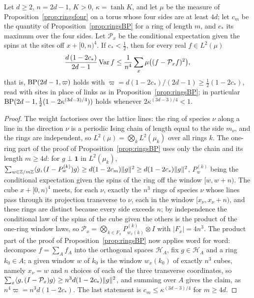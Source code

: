 \begin{proposition}
\label{prop:symBP}
Let $d\ge2$, $n=2d-1$, $K>0$, $\kappa=\tanh K$, and let $\mu$ be the measure of
Proposition~\ref{prop:ringsfour} on a torus whose four sides are at least
$4d$; let $c_m$ be the quantity of Proposition~\ref{prop:ringsBP} for a ring
of length $m$, and $c_*$ its maximum over the four sides. Let $\mathcal P_x$ be
the conditional expectation given the spins at the sites off $x+[0,n)^4$. If
$c_*<\frac12$, then for every real $f\in L^2(\mu)$
\[
\frac{d\,(1-2c_*)}{2d-1}\operatorname{Var} f\le\frac1{n^4}\sum_x\mu\bigl((f-\mathcal P_xf)^2
\bigr),
\]
that is, $\mathrm{BP}(2d-1,\varpi)$ holds with $\varpi=d(1-2c_*)/(2d-1)\ge\frac12(1-
2c_*)$, read with sites in place of links as in Proposition~\ref{prop:ringsBP};
in particular $\mathrm{BP}(2d-1,\frac12(1-2\kappa^{(3d-3)/4}))$ holds whenever
$2\kappa^{(3d-3)/4}<1$.
\end{proposition}

\begin{proof}
The weight factorises over the lattice lines: the ring of species $\nu$ along
a line in the direction $\nu$ is a periodic Ising chain of length equal to
the side $m_\nu$, and the rings are independent, so $L^2(\mu)=\bigotimes_k
L^2(\mu_k)$ over all rings $k$. The one-ring part of the proof of
Proposition~\ref{prop:ringsBP} uses only the chain and its length $m\ge4d$:
for $g\perp\mathbf1$ in $L^2(\mu_k)$, $\sum_{w\in\mathbb{Z}/m\mathbb{Z}}\langle g,(I-P^{(k)}_w)g\rangle
\ge d(1-2c_m)\|g\|^2\ge d(1-2c_*)\|g\|^2$, $P^{(k)}_w$ being the conditional
expectation given the spins of the ring off the window $[w,w+n)$. The cube
$x+[0,n)^4$ meets, for each $\nu$, exactly the $n^3$ rings of species $\nu$
whose lines pass through its projection transverse to $\nu$, each in the
window $[x_\nu,x_\nu+n)$, and these rings are distinct because every side
exceeds $n$; by independence the conditional law of the spins of the cube
given the others is the product of the one-ring window laws, so $\mathcal P_x
=\bigotimes_{k\in F_x}P^{(k)}_{w_x(k)}\otimes I$ with $|F_x|=4n^3$. The product
part of the proof of Proposition~\ref{prop:ringsBP} now applies word for
word: decompose $f=\sum_Af_A$ into the orthogonal spaces $\mathcal H_A$, fix
$g\in\mathcal H_A$ and a ring $k_0\in A$; a given window $w$ of $k_0$ is the
window $w_x(k_0)$ of exactly $n^3$ cubes, namely $x_\nu=w$ and $n$ choices of
each of the three transverse coordinates, so $\sum_x\langle g,(I-\mathcal P_x)g\rangle
\ge n^3d(1-2c_*)\|g\|^2$, and summing over $A$ gives the claim, as $n^4\varpi
=n^3d(1-2c_*)$. The last statement is $c_m\le\kappa^{(3d-3)/4}$ for $m\ge4d$.
\end{proof}

